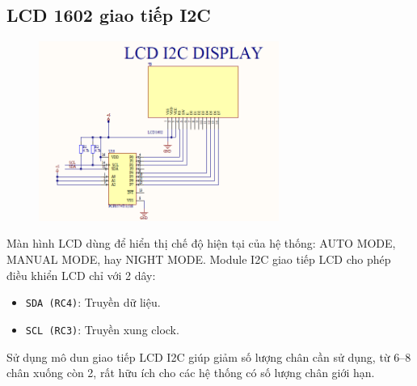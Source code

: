 \subsection{LCD 1602 giao tiếp I2C}
\begin{figure}[H]
    \centering
    \includegraphics[width=0.7\textwidth]{pictures/lcd_sch.png}
\end{figure}

Màn hình LCD dùng để hiển thị chế độ hiện tại của hệ thống: AUTO MODE, MANUAL MODE, hay NIGHT MODE. Module I2C giao tiếp LCD cho phép điều khiển LCD chỉ với 2 dây:
\begin{itemize}
    \item \texttt{SDA (RC4)}: Truyền dữ liệu.
    \item \texttt{SCL (RC3)}: Truyền xung clock.
\end{itemize}
Sử dụng mô dun giao tiếp LCD I2C giúp giảm số lượng chân cần sử dụng, từ 6--8 chân xuống còn 2, rất hữu ích cho các hệ thống có số lượng chân giới hạn.
